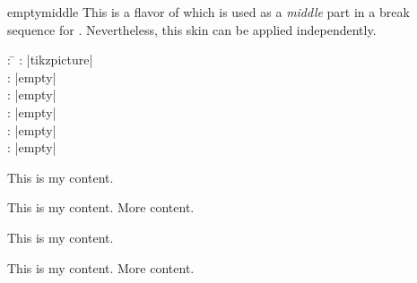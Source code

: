 \begin{docSkin}{emptymiddle}
This is a flavor of  which is used as a \emph{middle} part
in a break sequence for .
Nevertheless, this skin can be applied independently.
\begin{tcolorbox}[skintable=emptymiddle]
  \begin{tabbing}
    : \=\kill
    :  \> |tikzpicture|\\ 
    :           \> |empty|\\
    : \> |empty|\\ 
    :        \> |empty|\\
    :    \> |empty|\\
    :           \> |empty|
  \end{tabbing}
\end{tcolorbox}
\end{docSkin}


\begin{dispExample}
\begin{tcbraster}[empty,skin=emptymiddle,raster equal height,raster columns=4,
    coltitle=Navy,borderline={2pt}{0pt}{black!10!white},
    left=1mm,right=1mm,top=1mm,bottom=1mm,middle=1mm]
  \begin{tcolorbox}
    This is my content.
  \end{tcolorbox}
  \begin{tcolorbox}
    This is my content.
    \tcblower
    More content.
  \end{tcolorbox}
  \begin{tcolorbox}[adjusted title=My title]
    This is my content.
  \end{tcolorbox}
  \begin{tcolorbox}[adjusted title=My title]
    This is my content.
    \tcblower
    More content.
  \end{tcolorbox}
\end{tcbraster}
\end{dispExample}


